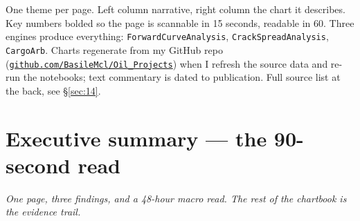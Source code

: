 \documentclass[10pt,a4paper]{article}
\begin{document}
\vspace{0.5cm}

\begin{callout}
One theme per page. Left column narrative, right column the chart it describes. Key numbers bolded so the page is scannable in 15 seconds, readable in 60. Three engines produce everything: \texttt{ForwardCurveAnalysis}, \texttt{CrackSpreadAnalysis}, \texttt{CargoArb}. Charts regenerate from my GitHub repo (\href{https://github.com/BasileMcl/Oil_Projects}{\texttt{github.com/BasileMcl/Oil\_Projects}}) when I refresh the source data and re-run the notebooks; text commentary is dated to publication. Full source list at the back, see \S\ref{sec:14}.
\end{callout}

\newpage

\section{Executive summary --- the 90-second read}\label{sec:1}

\textit{One page, three findings, and a 48-hour macro read. The rest of the chartbook is the evidence trail.}

\vspace{0.2cm}
\end{document}

